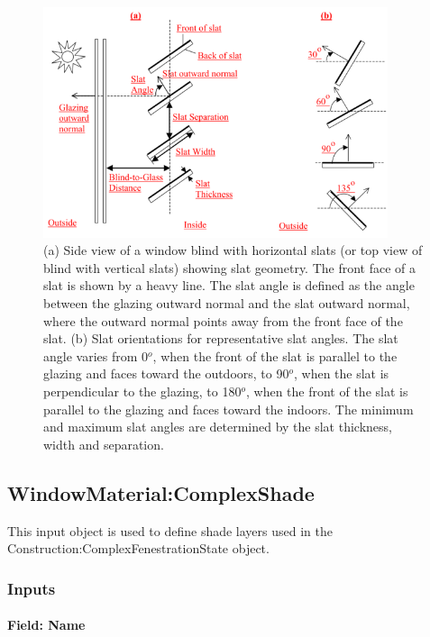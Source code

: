 \begin{figure}[hbtp] %
\centering
\includegraphics[width=0.9\textwidth, height=0.9\textheight, keepaspectratio=true]{media/image035.png}
\caption{(a) Side view of a window blind with horizontal slats (or top view of blind with vertical slats) showing slat geometry. The front face of a slat is shown by a heavy line. The slat angle is defined as the angle between the glazing outward normal and the slat outward normal, where the outward normal points away from the front face of the slat. (b) Slat orientations for representative slat angles. The slat angle varies from 0\(^{o}\), when the front of the slat is parallel to the glazing and faces toward the outdoors,  to 90\(^{o}\), when the slat is perpendicular to the glazing, to 180\(^{o}\), when the front of the slat is parallel to the glazing and faces toward the indoors. The minimum and maximum slat angles are determined by the slat thickness, width and separation. \protect \label{fig:a-side-view-of-a-window-blind-with-horizontal}}
\end{figure}

\subsection{WindowMaterial:ComplexShade}\label{windowmaterialcomplexshade}

This input object is used to define shade layers used in the Construction:ComplexFenestrationState object.

\subsubsection{Inputs}\label{inputs-24-003}

\paragraph{Field: Name}\label{field-name-18-007}


